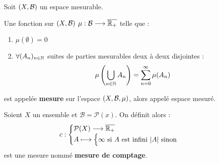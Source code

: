Soit $(X, \mathcal{B})$ un espace mesurable.

\begin{definition}[Mesure]
    Une fonction sur $(X, \mathcal{B})$ $ \mu : \mathcal{B} \longrightarrow \overline{\mathbb{R}_+} $ telle que :
    \begin{enumerate}
        \item $\mu (\emptyset) = 0 $
        \item $ \forall (A_n)_{n\in\mathbb{N}}$ suites de parties mesurables deux à deux disjointes :
            \[ \mu \left( \bigcup_{n\in\mathbb{N}} A_n \right) = \sum_{n=0}^{\infty} \mu (A_n) \]
    \end{enumerate}
    est appelée \textbf{mesure} sur l'espace $(X,\mathcal{B},\mu)$, alors appelé espace mesuré.
\end{definition}

\begin{example}
    Soient $X$ un ensemble et $\mathcal{B} = \mathcal{P}(x)$. On définit alors :
        \[ c :
            \begin{cases}
                \mathcal{P}(X) \longrightarrow \overline{\mathbb{R}_+} \\
                A \longmapsto \begin{cases}
                                    \infty \text{ si } A \text{ est infini }
                                    |A| \text{ sinon }
                                \end{cases}
            \end{cases}
        \] 
    est une mesure nommé \textbf{mesure de comptage}.
\end{example}

